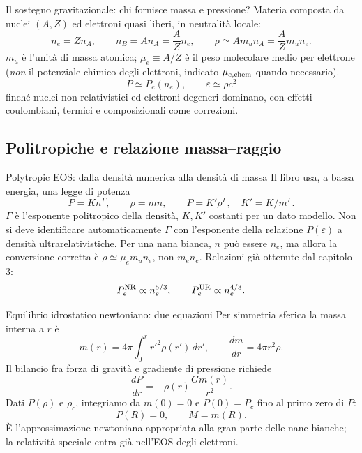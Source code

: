 \begin{frame}[t]{Il sostegno gravitazionale: chi fornisce massa e pressione?}
\small
Materia composta da nuclei $(A,Z)$ ed elettroni quasi liberi, in neutralità locale:
\[
n_e=Z n_A,\qquad n_B=A n_A=\frac AZ n_e,\qquad
\rho\simeq A m_u n_A=\frac AZ m_u n_e.
\]
$m_u$ è l'unità di massa atomica; $\mu_e\equiv A/Z$ è il peso molecolare medio per elettrone (\emph{non} il potenziale chimico degli elettroni, indicato $\mu_{e,\rm chem}$ quando necessario).
\[
P\simeq P_e(n_e),\qquad \varepsilon\simeq\rho c^2
\]
finché nuclei non relativistici ed elettroni degeneri dominano, con effetti coulombiani, termici e composizionali come correzioni.
\end{frame}

\subsection{Politropiche e relazione massa--raggio}\label{ssec:politropicheMR}

\begin{frame}[t]{Polytropic EOS: dalla densità numerica alla densità di massa}
\small
Il libro usa, a bassa energia, una legge di potenza
\[
P=K n^\Gamma,\qquad\rho=m n,\qquad
P=K'\rho^\Gamma,\quad K'=K/m^\Gamma.
\]
$\Gamma$ è l'esponente politropico della densità, $K,K'$ costanti per un dato modello. Non si deve identificare automaticamente $\Gamma$ con l'esponente della relazione $P(\varepsilon)$ a densità ultrarelativistiche.
\medskip
Per una nana bianca, $n$ può essere $n_e$, ma allora la conversione corretta è $\rho\simeq\mu_e m_u n_e$, non $m_e n_e$.
\medskip
Relazioni già ottenute dal capitolo 3:
\[
P_e^{\rm NR}\propto n_e^{5/3},\qquad P_e^{\rm UR}\propto n_e^{4/3}.
\]
\end{frame}

\begin{frame}[t]{Equilibrio idrostatico newtoniano: due equazioni}
\small
Per simmetria sferica la massa interna a $r$ è
\[
m(r)=4\pi\int_0^r r'^2\rho(r')\,dr',\qquad
\frac{dm}{dr}=4\pi r^2\rho.
\]
Il bilancio fra forza di gravità e gradiente di pressione richiede
\[
\frac{dP}{dr}=-\rho(r)\frac{Gm(r)}{r^2}.
\]
Dati $P(\rho)$ e $\rho_c$, integriamo da $m(0)=0$ e $P(0)=P_c$ fino al primo zero di $P$:
\[
P(R)=0,\qquad M=m(R).
\]
È l'approssimazione newtoniana appropriata alla gran parte delle nane bianche; la relatività speciale entra già nell'EOS degli elettroni.
\end{frame}

